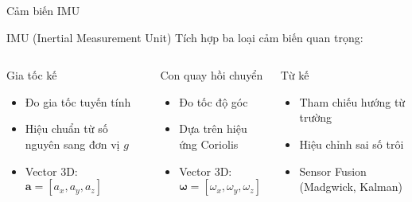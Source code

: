 \begin{frame}{Cảm biến IMU}
\begin{block}{IMU (Inertial Measurement Unit)}
Tích hợp ba loại cảm biến quan trọng:
\end{block}

\begin{columns}
\begin{alertblock}{Gia tốc kế}
\begin{itemize}
\item Đo gia tốc tuyến tính
\item Hiệu chuẩn từ số nguyên sang đơn vị $g$
\item Vector 3D: $\mathbf{a} = [a_x, a_y, a_z]$
\end{itemize}
\end{alertblock}

\begin{alertblock}{Con quay hồi chuyển}
\begin{itemize}
\item Đo tốc độ góc
\item Dựa trên hiệu ứng Coriolis
\item Vector 3D: $\boldsymbol{\omega} = [\omega_x, \omega_y, \omega_z]$
\end{itemize}
\end{alertblock}

\begin{alertblock}{Từ kế}
\begin{itemize}
\item Tham chiếu hướng từ trường
\item Hiệu chỉnh sai số trôi
\item Sensor Fusion (Madgwick, Kalman)
\end{itemize}
\end{alertblock}
\end{columns}
\end{frame}

